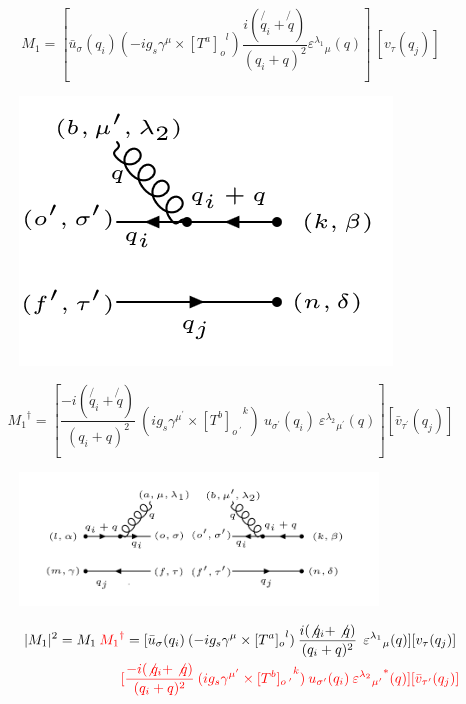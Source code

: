 \begin{equation}
M_1 = [{\bar{u}}_{\sigma}(q_i) (-ig_s \gamma^{\mu}\times {[T^a]_o}^l)  \frac{i(\not{q_i} + \not{q})}{(q_i + q)^2} {\varepsilon^{\lambda_1}}_{\mu} (q)]\: [{v}_{\tau}(q_j)]
\end{equation}
\pagebreak
\begin{figure}[h!]
\centering
\includegraphics[scale=0.7]{images/qgqbarMDega.png}
\end{figure}

\begin{equation}
{M_1}^{\dagger} = [\frac{-i(\not{q_i} + \not{q})}{(q_i + q)^2} \:  (ig_s \gamma^{{\mu}^{\prime}}\times {[T^b]_{o\:^{\prime}}}^k) \: u_{{\sigma}^{\prime}}(q_i) \: {\varepsilon^{\lambda_2}}_{{\mu}^{\prime}} (q)][{\bar{v}}_{{\tau}^{\prime}}(q_j)]
\end{equation}

\begin{figure}[h!]
\centering
\includegraphics[width=0.85\textwidth]{images/qgqbarMSquer.png}
\end{figure}

\begin{equation}
\begin{split}
|M_1|^2=M_1\:{\color[RGB]{255,0,0} {M_1}^{\dagger}} = [{\bar{u}}_{\sigma}(q_i)\: (-ig_s \gamma^{\mu}\times {[T^a]_o}^l) \: \frac{i(\not{q_i} + \not{q})}{(q_i + q)^2}\:\: {\varepsilon^{\lambda_1}}_{\mu} (q)] [{v}_{\tau}(q_j)]\: \\
\quad\quad\quad\quad\quad\quad\quad\quad\:\:{\color[RGB]{255,0,0}[\frac{-i(\not{q_i} + \not{q})}{(q_i + q)^2} \:  (ig_s \gamma^{{\mu}^{\prime}}\times {[T^b]_{o\:^{\prime}}}^k) \: u_{{\sigma}^{\prime}}(q_i) \: {{\varepsilon^{\lambda_2}}_{{\mu}^{\prime}}}^* (q)][{\bar{v}}_{{\tau}^{\prime}}(q_j)]}
\end{split}
\end{equation}


